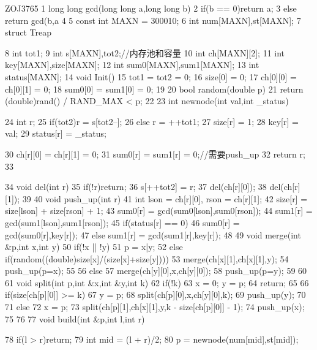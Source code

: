 \documentclass[11pt]{article}
\begin{document}
\begin{Code}
      ZOJ3765
 1    long long gcd(long long a,long long b){
 2        if(b == 0)return a;
 3        else return gcd(b,a%
 4    }
 5    const int MAXN = 300010;
 6    int num[MAXN],st[MAXN];
 7    struct Treap{
 8        int tot1;
 9        int s[MAXN],tot2;//内存池和容量
10        int ch[MAXN][2];
11        int key[MAXN],size[MAXN];
12        int sum0[MAXN],sum1[MAXN];
13        int status[MAXN];
14        void Init(){
15            tot1 = tot2 = 0;
16            size[0] = 0;
17            ch[0][0] = ch[0][1] = 0;
18            sum0[0] = sum1[0] = 0;
19        }
20        bool random(double p){
21            return (double)rand() / RAND_MAX < p;
22        }
23        int newnode(int val,int _status){
24            int r;
25            if(tot2)r = s[tot2--];
26            else r = ++tot1;
27            size[r] = 1;
28            key[r] = val;
29            status[r] = _status;


30              ch[r][0] = ch[r][1] = 0;
31              sum0[r] = sum1[r] = 0;//需要push_up
32              return r;
33       }
34       void del(int r){
35           if(!r)return;
36           s[++tot2] = r;
37           del(ch[r][0]);
38           del(ch[r][1]);
39       }
40       void push_up(int r){
41           int lson = ch[r][0], rson = ch[r][1];
42           size[r] = size[lson] + size[rson] + 1;
43           sum0[r] = gcd(sum0[lson],sum0[rson]);
44           sum1[r] = gcd(sum1[lson],sum1[rson]);
45           if(status[r] == 0)
46               sum0[r] = gcd(sum0[r],key[r]);
47           else sum1[r] = gcd(sum1[r],key[r]);
48       }
49       void merge(int &p,int x,int y){
50           if(!x || !y)
51               p = x|y;
52           else if(random((double)size[x]/(size[x]+size[y]))){
53               merge(ch[x][1],ch[x][1],y);
54               push_up(p=x);
55           }
56           else{
57               merge(ch[y][0],x,ch[y][0]);
58               push_up(p=y);
59           }
60       }
61       void split(int p,int &x,int &y,int k){
62           if(!k){
63               x = 0; y = p;
64               return;
65           }
66           if(size[ch[p][0]] >= k){
67               y = p;
68               split(ch[p][0],x,ch[y][0],k);
69               push_up(y);
70           }
71           else{
72               x = p;
73               split(ch[p][1],ch[x][1],y,k - size[ch[p][0]] - 1);
74               push_up(x);
75           }
76       }
77       void build(int &p,int l,int r){
78           if(l > r)return;
79           int mid = (l + r)/2;
80           p = newnode(num[mid],st[mid]);


}}
\end{Code}
\end{document}
